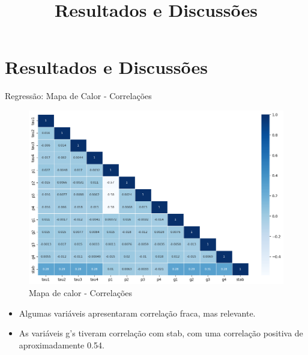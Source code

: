 \documentclass{beamer}
\begin{document}
\section{Resultados e Discussões}

\begin{frame}
    \title{Resultados e Discussões}
    \author{}
    \date{}
    \maketitle
\end{frame}

\begin{frame}{Regressão: Mapa de Calor - Correlações}
    \begin{figure}[H]
        \centering
        \includegraphics[width=0.9\linewidth]{Mapa_calor_corr.png}
        \caption{Mapa de calor - Correlações}
    \end{figure}

    \begin{itemize}
        \item Algumas variáveis apresentaram correlação fraca, mas relevante.
        \item As variáveis g's tiveram correlação com stab, com uma correlação positiva de aproximadamente 0.54.
    \end{itemize}
\end{frame}
\end{document}
